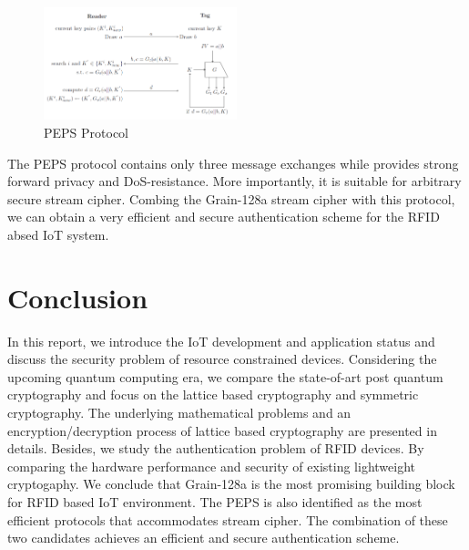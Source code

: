 \documentclass[preprint,10pt,5p]{elsarticle}
\begin{document}
\begin{figure}[H]
\centering
\includegraphics[width=0.5\textwidth]{PEPS.png}
\caption{ PEPS Protocol}
\end{figure}

The PEPS protocol contains only three message exchanges while provides strong forward privacy and DoS-resistance. More importantly, it is suitable for arbitrary secure stream cipher. Combing the Grain-128a stream cipher with this protocol, we can obtain a very efficient and secure authentication scheme for the RFID absed IoT system.

\section{Conclusion}
In this report, we introduce the IoT development and application status and discuss the security problem of resource constrained devices. Considering the upcoming quantum computing era, we compare the state-of-art post quantum cryptography and focus on the lattice based cryptography and symmetric cryptography. The underlying mathematical problems and an encryption/decryption process of lattice based cryptography are presented in details. Besides, we study the authentication problem of RFID devices. By comparing the hardware performance and security of existing lightweight cryptogaphy. We conclude that Grain-128a is the most promising building block for RFID based IoT environment. The PEPS is also identified as the most efficient protocols that accommodates stream cipher. The combination of these two candidates achieves an efficient and secure authentication scheme.  







%
% 
% 
% 
% 
% 
% 
% 
% 
% 
% 
% 


\end{document}
